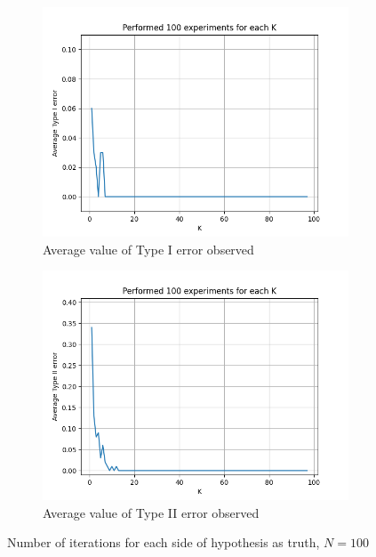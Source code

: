 \documentclass[fleqn, 11pt]{article}
\begin{document}
\vspace{30pt}
\begin{figure}[H]
    \centering
    \begin{subfigure}[H]{0.49\textwidth}
        \centering
        \includegraphics[width=\textwidth]{P4/type1_100.png}
        \caption[]{Average value of Type I error observed}
    \end{subfigure}
    \begin{subfigure}[H]{0.49\textwidth}
        \centering
        \includegraphics[width=\textwidth]{P4/type2_100.png}
        \caption[]{Average value of Type II error observed}
    \end{subfigure}
    \caption{Number of iterations for each side of hypothesis as truth, $N = 100$}
\end{figure}
\end{document}
